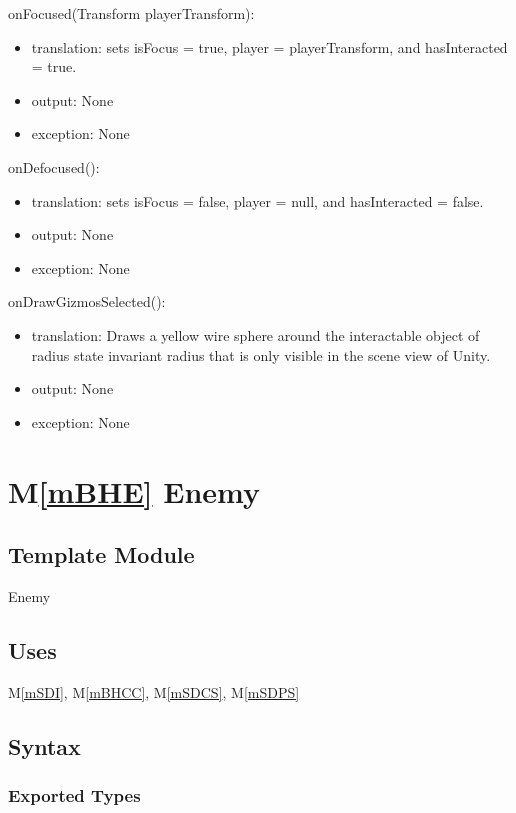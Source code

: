 \documentclass[12pt]{article}
\newcommand{\mref}[1]{M\ref{#1}}
\begin{document}
\noindent onFocused(Transform playerTransform):
\begin{itemize}
\item translation: sets isFocus = true, player = playerTransform, and hasInteracted = true.
\item output: None
\item exception: None
\end{itemize}

\noindent onDefocused():
\begin{itemize}
\item translation: sets isFocus = false, player = null, and hasInteracted = false.
\item output: None
\item exception: None
\end{itemize}

\noindent onDrawGizmosSelected():
\begin{itemize}
\item translation: Draws a yellow wire sphere around the interactable object of radius state invariant radius that is only visible in the scene view of Unity.
\item output: None
\item exception: None
\end{itemize}

\section* {\mref{mBHE} Enemy}

\subsection*{Template Module}

Enemy

\subsection* {Uses}

\mref{mSDI}, \mref{mBHCC}, \mref{mSDCS}, \mref{mSDPS}

\subsection* {Syntax}

\subsubsection* {Exported Types}
\end{document}
